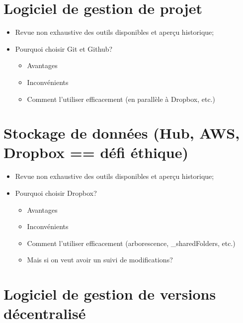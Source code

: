 \documentclass[
  letterpaper,
]{scrbook}
\providecommand{\tightlist}{%
  \setlength{\itemsep}{0pt}\setlength{\parskip}{0pt}}\usepackage{longtable,booktabs,array}
\begin{document}
\hypertarget{logiciel-de-gestion-de-projet}{%
\section{Logiciel de gestion de
projet}\label{logiciel-de-gestion-de-projet}}

\begin{itemize}
\tightlist
\item
  Revue non exhaustive des outils disponibles et aperçu historique;
\item
  Pourquoi choisir Git et Github?

  \begin{itemize}
  \tightlist
  \item
    Avantages
  \item
    Inconvénients
  \item
    Comment l'utiliser efficacement (en parallèle à Dropbox, etc.)
  \end{itemize}
\end{itemize}

\hypertarget{stockage-de-donnuxe9es-hub-aws-dropbox-duxe9fi-uxe9thique}{%
\section{Stockage de données (Hub, AWS, Dropbox == défi
éthique)}\label{stockage-de-donnuxe9es-hub-aws-dropbox-duxe9fi-uxe9thique}}

\begin{itemize}
\tightlist
\item
  Revue non exhaustive des outils disponibles et aperçu historique;
\item
  Pourquoi choisir Dropbox?

  \begin{itemize}
  \tightlist
  \item
    Avantages
  \item
    Inconvénients
  \item
    Comment l'utiliser efficacement (arborescence, \_sharedFolders,
    etc.)
  \item
    Mais si on veut avoir un suivi de modifications?
  \end{itemize}
\end{itemize}

\hypertarget{logiciel-de-gestion-de-versions-duxe9centralisuxe9}{%
\section{Logiciel de gestion de versions
décentralisé}\label{logiciel-de-gestion-de-versions-duxe9centralisuxe9}}
\end{document}
